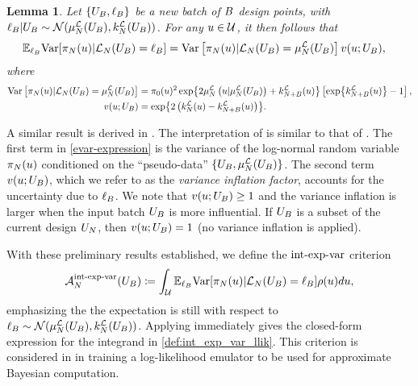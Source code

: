\documentclass[12pt]{article}
\newtheorem{lemma}{Lemma}
\begin{document}
\begin{lemma} \label{lemma:evar}
Let $\{\designBatchIn, \designBatchLlik\}$ be a new batch of $\Nbatch$ design points, with 
$\designBatchLlik | \designBatchIn \sim \Gaussian(\emMean[\Ndesign]{\llik}(\designBatchIn), \emKer[\Ndesign]{\llik}(\designBatchIn))$. 
For any $\Par \in \parSpace$, it then follows that 
\begin{align}
\E_{\designBatchLlik} \Var[\llikEmRdmDens[\Ndesign](\Par) | \llikEm[\Ndesign](\designBatchIn) = \designBatchLlik]
&= \Var\left[\llikEmRdmDens[\Ndesign](\Par) | \llikEm[\Ndesign](\designBatchIn) = \emMean[\Ndesign]{\llik}(\designBatchIn)\right]
	\varInflation(\Par; \designBatchIn), \label{evar-expression}
\end{align}
where 
\begin{align}
\Var\left[\llikEmRdmDens[\Ndesign](\Par) | \llikEm[\Ndesign](\designBatchIn) = \emMean[\Ndesign]{\llik}(\designBatchIn)\right]
&= \priorDens(\Par)^2 \Exp{2\emMean[\Ndesign]{\llik}\left(\Par| \emMean[\Ndesign]{\llik}(\designBatchIn)\right) + \emKer[\Naugment]{\llik}(\Par)} 
\left[\Exp{\emKer[\Naugment]{\llik}(\Par)} - 1 \right], \nonumber \\
\varInflation(\Par; \designBatchIn)
&= \Exp{2\left(\emKer[\Ndesign]{\llik}(\Par) - \emKer[\Naugment]{\llik}(\Par)\right)}. \label{var_inflation_factor}
\end{align}
\end{lemma}

A similar result is derived in \cite{VehtariParallelGP}.
The interpretation of  is similar to that of . 
The first term in \ref{evar-expression} is the variance of the log-normal random variable
 $\llikEmRdmDens[\Ndesign](\Par)$ conditioned on the ``pseudo-data''
 $\{\designBatchIn, \emMean[\Ndesign]{\llik}(\designBatchIn)\}$. The second term 
 $\varInflation(\Par; \designBatchIn)$, which we refer to as the \textit{variance inflation factor}, 
 accounts for the uncertainty due to $\designBatchLlik$. We note that 
$\varInflation(\Par; \designBatchIn) \geq 1$ and the variance inflation is larger when the 
input batch $\designBatchIn$ is more influential. If $\designBatchIn$ is a subset of the 
current design $\designIn[\Ndesign]$, then $\varInflation(\Par; \designBatchIn) = 1$ (no 
variance inflation is applied). 

With these preliminary results established, we define the $\intExpVarLabel$ criterion
\begin{align}
\labelAcq[\Ndesign]{\intExpVarLabel}(\designBatchIn) \Def
\int_{\parSpace} \E_{\designBatchLlik} \Var[\llikEmRdmDens[\Ndesign](\Par) | \llikEm[\Ndesign](\designBatchIn) = \designBatchLlik] \weightDens(\Par) d\Par, \label{def:int_exp_var_llik}
\end{align}
emphasizing the the expectation is still with respect to 
$\designBatchLlik \sim \Gaussian(\emMean[\Ndesign]{\llik}(\designBatchIn), \emKer[\Ndesign]{\llik}(\designBatchIn))$. 
Applying  immediately gives the closed-form expression for the integrand in \ref{def:int_exp_var_llik}. 
This criterion is considered in \cite{VehtariParallelGP} in training a log-likelihood emulator to be used for 
approximate Bayesian computation.
\end{document}
